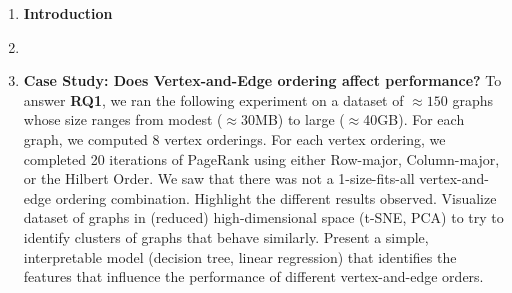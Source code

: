 \begin{enumerate}[label*=\arabic*.]
  \item {\textbf{Introduction}}
  \item {
    
    
  }
  \item {\textbf{Case Study: Does Vertex-and-Edge ordering affect performance?}
  To answer \textbf{RQ1}, we ran the following experiment on a dataset of $\approx 150$ graphs whose size ranges from modest ($\approx$30MB) to large ($\approx$40GB). For each graph, we computed 8 vertex orderings. For each vertex ordering, we completed 20 iterations of PageRank using either Row-major, Column-major, or the Hilbert Order. We saw that there was not a 1-size-fits-all vertex-and-edge ordering combination.
  Highlight the different results observed. Visualize dataset of graphs in (reduced) high-dimensional space (t-SNE, PCA) to try to identify clusters of graphs that behave similarly. Present a simple, interpretable model (decision tree, linear regression) that identifies the features that influence the performance of different vertex-and-edge orders.  
  }
  


\end{enumerate}
